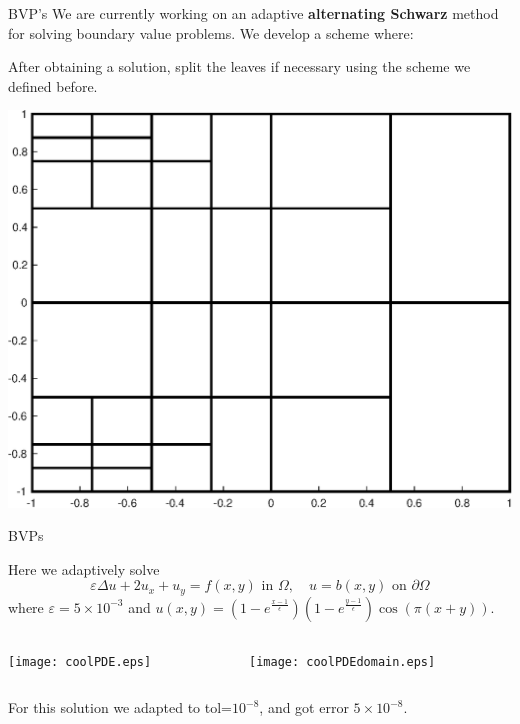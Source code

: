 \documentclass{beamer}
\begin{document}
\begin{frame}{BVP's}
		We are currently working on an adaptive \textbf{alternating Schwarz} method for solving boundary value problems. We develop a scheme where:
\bigskip

		After obtaining a solution, split the leaves if necessary using the scheme we defined before.
\bigskip

	\begin{center}
		\includegraphics[scale = 0.3]{zonePlot2.eps}
	\end{center}
\end{frame}

\begin{frame}{BVPs}

Here we adaptively solve
$$
\varepsilon \Delta u + 2 u_x+u_y = f(x,y) \text{ in } \Omega, \quad u=b(x,y) \text{ on } \partial\Omega
$$
\bigskip
where $\varepsilon=5\times10^{-3}$ and $u(x,y) = \left(1-e^{\frac{x-1}{\epsilon }}\right) \left(1-e^{\frac{y-1}{\epsilon }}\right) \cos (\pi  (x+y)).$
\begin{columns}[t]

\begin{column}{0.5\textwidth}	
\begin{center}
\texttt{[image: coolPDE.eps]}	
\end{center}
\end{column}

\begin{column}{0.5\textwidth}
\begin{center}
\texttt{[image: coolPDEdomain.eps]}	
\end{center}
\end{column}

\end{columns}

\begin{center}
For this solution we adapted to tol=$10^{-8}$, and got error $5 \times 10^{-8}$.
\end{center}

\end{frame}
\end{document}
